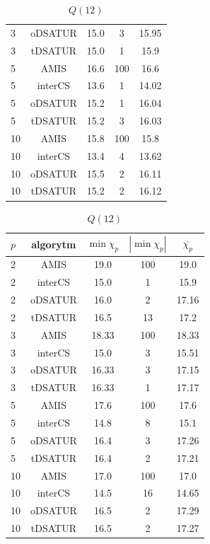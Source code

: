 \documentclass[10pt,a4paper]{article}
\begin{document}
\begin{table}[H]
\begin{minipage}{.5\linewidth}
\begin{tabular}{|l|c|c|c|c|}
				3 & oDSATUR & 15.0 & 3 & 15.95 \\
				3 & tDSATUR & 15.0 & 1 & 15.9 \\
				\hline
				5 & AMIS & 16.6 & 100 & 16.6 \\
				5 & interCS & 13.6 & 1 & 14.02 \\
				5 & oDSATUR & 15.2 & 1 & 16.04 \\
				5 & tDSATUR & 15.2 & 3 & 16.03 \\
				\hline
				10 & AMIS & 15.8 & 100 & 15.8 \\
				10 & interCS & 13.4 & 4 & 13.62 \\
				10 & oDSATUR & 15.5 & 2 & 16.11 \\
				10 & tDSATUR & 15.2 & 2 & 16.12 \\
				\hline
			\end{tabular}
			\caption{$Q(12)$}
		\end{minipage}
		\begin{minipage}{.5\linewidth}
			\centering
			\begin{tabular}{|l|c|c|c|c|}
				\hline
				\textbf{$p$} & \textbf{algorytm} & \textbf{$\min \chi_{p}$} & \textbf{$|\min \chi_{p}|$} & \textbf{$\overline{\chi_{p}}$} \\
				\hline
				2 & AMIS & 19.0 & 100 & 19.0 \\
				2 & interCS & 15.0 & 1 & 15.9 \\
				2 & oDSATUR & 16.0 & 2 & 17.16 \\
				2 & tDSATUR & 16.5 & 13 & 17.2 \\
				\hline
				3 & AMIS & 18.33 & 100 & 18.33 \\
				3 & interCS & 15.0 & 3 & 15.51 \\
				3 & oDSATUR & 16.33 & 3 & 17.15 \\
				3 & tDSATUR & 16.33 & 1 & 17.17 \\
				\hline
				5 & AMIS & 17.6 & 100 & 17.6 \\
				5 & interCS & 14.8 & 8 & 15.1 \\
				5 & oDSATUR & 16.4 & 3 & 17.26 \\
				5 & tDSATUR & 16.4 & 2 & 17.21 \\
				\hline
				10 & AMIS & 17.0 & 100 & 17.0 \\
				10 & interCS & 14.5 & 16 & 14.65 \\
				10 & oDSATUR & 16.5 & 2 & 17.29 \\
				10 & tDSATUR & 16.5 & 2 & 17.27 \\
				\hline
			\end{tabular}

\end{minipage}
\end{table}
\end{document}
